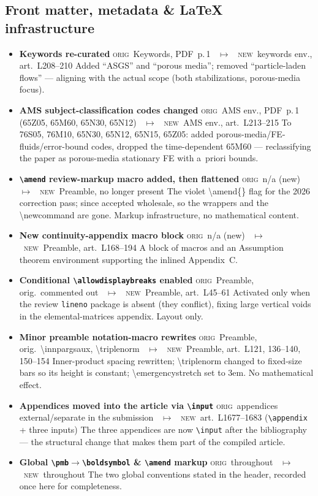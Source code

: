 \documentclass[11pt]{article}
\newcommand{\Orig}{\textcolor{origc}{\footnotesize\textsc{orig}}}
\newcommand{\New}{\textcolor{newc}{\footnotesize\textsc{new}}}
\newcommand{\code}[1]{\textcolor{newc}{\ttfamily\small #1}}
\newcommand{\pdfp}[1]{PDF~p.\,#1}
\newcommand{\artl}[1]{art.\ L#1}       %
\newcommand{\ch}[4]{%
  \item \textbf{#1}\newline
    {\footnotesize\Orig\ #2 \ \textcolor{locc}{$\longmapsto$} \ \New\ #3}\newline
    #4}
\begin{document}
\subsection{Front matter, metadata \& LaTeX infrastructure}
\begin{itemize}
\ch{Keywords re-curated}
   {Keywords, \pdfp{1}}{keywords env., \artl{208}--210}
   {Added ``ASGS'' and ``porous media''; removed ``particle-laden flows'' --- aligning with the actual
    scope (both stabilizations, porous-media focus).}
\ch{AMS subject-classification codes changed}
   {AMS env., \pdfp{1} (65Z05, 65M60, 65N30, 65N12)}{AMS env., \artl{213}--215}
   {To 76S05, 76M10, 65N30, 65N12, 65N15, 65Z05: added porous-media/FE-fluids/error-bound codes,
    dropped the time-dependent 65M60 --- reclassifying the paper as porous-media stationary FE with
    a~priori bounds.}
\ch{\texttt{\textbackslash amend} review-markup macro added, then flattened}
   {n/a (new)}{Preamble, no longer present}
   {The violet \code{\textbackslash amend\{\}} flag for the 2026 correction pass; since accepted
    wholesale, so the wrappers and the \code{\textbackslash newcommand} are gone. Markup
    infrastructure, no mathematical content.}
\ch{New continuity-appendix macro block}
   {n/a (new)}{Preamble, \artl{168}--194}
   {A block of macros and an Assumption theorem environment supporting the inlined Appendix~C.}
\ch{Conditional \texttt{\textbackslash allowdisplaybreaks} enabled}
   {Preamble, orig.\ commented out}{Preamble, \artl{45}--61}
   {Activated only when the review \texttt{lineno} package is absent (they conflict), fixing large
    vertical voids in the elemental-matrices appendix. Layout only.}
\ch{Minor preamble notation-macro rewrites}
   {Preamble, orig.\ \code{\textbackslash innpargsaux}, \code{\textbackslash triplenorm}}
   {Preamble, \artl{121}, 136--140, 150--154}
   {Inner-product spacing rewritten; \code{\textbackslash triplenorm} changed to fixed-size bars so
    its height is constant; \code{\textbackslash emergencystretch} set to 3em. No mathematical effect.}
\ch{Appendices moved into the article via \texttt{\textbackslash input}}
   {appendices external/separate in the submission}{\artl{1677}--1683 (\texttt{\textbackslash appendix} + three inputs)}
   {The three appendices are now \texttt{\textbackslash input} after the bibliography --- the structural
    change that makes them part of the compiled article.}
\ch{Global \texttt{\textbackslash pmb}$\to$\texttt{\textbackslash boldsymbol} \& \texttt{\textbackslash amend} markup}
   {throughout}{throughout}
   {The two global conventions stated in the header, recorded once here for completeness.}
\end{itemize}
\end{document}
